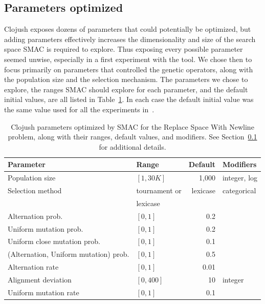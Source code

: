 \subsection{Parameters optimized}
\label{sec:parametersOptimized}

Clojush exposes dozens of parameters that could potentially be optimized, but
adding parameters effectively increases the dimensionality and size of the
search space SMAC is required to explore. Thus exposing every possible parameter
seemed unwise, especially in a first experiment with the tool. We chose then
to focus primarily on parameters that controlled the genetic operators, along
with the population size and the selection mechanism. The parameters we chose 
to explore, the ranges SMAC should explore for each parameter, and the 
default initial values, are all listed in Table~\ref{tab:clojushParameters}.
In each case the default initial value was the same value used for all the
experiments in~\cite{Helmuth:2015:GECCO}.

\begin{table}
	\begin{center}
	\begin{tabular}{l@{\quad} @{\enskip}l@{\quad} @{\enskip}r@{\quad} @{\enskip}l}
		Parameter & Range & Default & Modifiers \\
		\hline
		Population size & $[1, 30K]$ & 1,000 & integer, log \\
		Selection method & tournament or & lexicase & categorical \\
		& \quad lexicase \\
		\hline
		Alternation prob. & $[0, 1]$ & 0.2 \\
		Uniform mutation prob. & $[0, 1]$ & 0.2 \\
		Uniform close mutation prob. & $[0, 1]$ & 0.1 \\
		(Alternation, Uniform mutation) prob. & $[0, 1]$ & 0.5 \\
		\hline
		Alternation rate & $[0, 1]$ & 0.01 \\
		Alignment deviation & $[0, 400]$ & 10 & integer \\
		\hline
		Uniform mutation rate & $[0, 1]$ & 0.1
	\end{tabular}
	\end{center}
	\caption{Clojush parameters optimized by SMAC for the Replace Space With Newline problem, along with their ranges, 
		default values, and modifiers. See Section~\ref{sec:parametersOptimized} for additional details.}
	\label{tab:clojushParameters}
\end{table}

